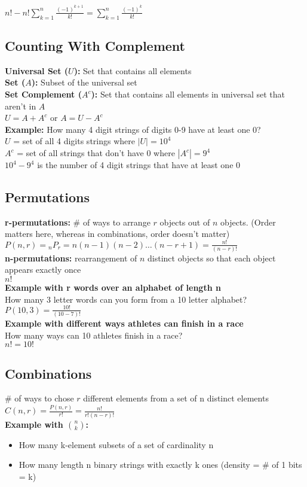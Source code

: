 \documentclass{article}
\begin{document}
\begin{spacing}{1.5}
$n! - n!\sum_{k=1}^n\frac{(-1)^{k+1}}{k!}=\sum_{k=1}^n\frac{(-1)^{k}}{k!}$


%
\subsection{Counting With Complement}
\label{sec:complement}
\textbf{Universal Set ($U$):} Set that contains all elements\\
\textbf{Set ($A$):} Subset of the universal set\\
\textbf{Set Complement ($A^c$):} Set that contains all elements in universal set that aren't in $A$\\
$U = A + A^c$ or $A = U - A^c$\\
\textbf{Example:} How many 4 digit strings of digits 0-9 have at least one 0?\\
$U$ = set of all 4 digits strings where $|U| = 10^4$\\
$A^c$ = set of all strings that don't have 0 where $|A^c| = 9^4$\\
$10^4-9^4$ is the number of 4 digit strings that have at least one 0
%
\subsection{Permutations}
\label{sec:permutations}
\textbf{r-permutations:} \# of ways to arrange $r$ objects out of $n$ objects. (Order matters here, whereas in combinations, order doesn't matter)\\
$P(n,r) = {}_nP{}_r = n(n-1)(n-2)\dots(n-r+1) = \frac{n!}{(n-r)!}$\\
\textbf{n-permutations:} rearrangement of $n$ distinct objects so that each object appears exactly once\\
$n!$\\
\textbf{Example with r words over an alphabet of length n}\\
How many 3 letter words can you form from a 10 letter alphabet?\\
$P(10, 3) = \frac{10!}{(10-7)!}$\\
\textbf{Example with different ways athletes can finish in a race}\\
How many ways can 10 athletes finish in a race?\\
$n! = 10!$

% 
\subsection{Combinations}
\label{sec:combinations}
\# of ways to chose $r$ different elements from a set of n distinct elements
$C(n,r) = \frac{P(n,r)}{r!} = \frac{n!}{r!(n-r)!}$\\
\textbf{Example with $\binom{n}{k}$:}
\begin{itemize}
    \item How many k-element subsets of a set of cardinality n
    \item How many length n binary strings with exactly k ones (density = \# of 1 bits = k)
\end{itemize}
%

\end{spacing}
\end{document}
